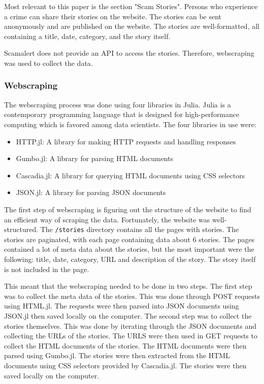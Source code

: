 \documentclass[12pt,english,titlepage,a4paper]{article}
\begin{document}
Most relevant to this paper is the section "Scam Stories". Persons who experience a crime can share their stories on the website. The stories can be sent anonymously and are published on the website. The stories are well-formatted, all containing a title, date, category, and the story itself.

Scamalert does not provide an API to access the stories. Therefore, webscraping was used to collect the data. 

\subsubsection{Webscraping}

The webscraping process was done using four libraries in Julia. Julia is a contemporary programming language that is designed for high-performance computing which is favored among data scientists. %
The four libraries in use were:

\begin{itemize}
    \item HTTP.jl: A library for making HTTP requests and handling responses 
    \item Gumbo.jl: A library for parsing HTML documents
    \item Cascadia.jl: A library for querying HTML documents using CSS selectors
    \item JSON.jl: A library for parsing JSON documents
\end{itemize}

The first step of webscraping is figuring out the structure of the website to find an efficient way of scraping the data. Fortunately, the website was well-structured. The \texttt{/stories} directory contains all the pages with stories. The stories are paginated, with each page containing data about 6 stories. The pages contained a lot of meta data about the stories, but the most important were the following: title, date, category, URL and description of the story. The story itself is not included in the page. 

This meant that the webscraping needed to be done in two steps. The first step was to collect the meta data of the stories. This was done through POST requests using HTML.jl. The requests were then parsed into JSON documents using JSON.jl then saved locally on the computer. The second step was to collect the stories themselves. This was done by iterating through the JSON documents and collecting the URLs of the stories. The URLS were then used in GET requests to collect the HTML documents of the stories. The HTML documents were then parsed using Gumbo.jl. The stories were then extracted from the HTML documents using CSS selectors provided by Cascadia.jl. The stories were then saved locally on the computer.
\end{document}
